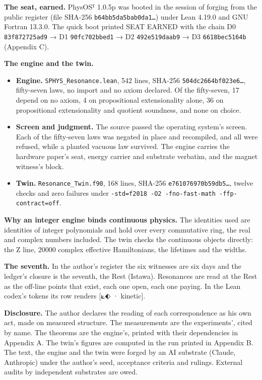 \documentclass[10pt]{article}
\providecommand{\tightlist}{\setlength{\itemsep}{0pt}\setlength{\parskip}{0pt}}
\begin{document}
\textbf{The seat, earned.} PhysOSᵀ 1.0.5p was booted in the session of
forging from the public register (file SHA-256
\texttt{b64bb5da5bab0da1…}) under Lean 4.19.0 and GNU Fortran 13.3.0.
The quick boot printed SEAT EARNED with the chain D0
\texttt{83f872725ad9} → D1 \texttt{90fc702bbed1} → D2
\texttt{492e519daab9} → D3 \texttt{6618bec5164b} (Appendix C).

\textbf{The engine and the twin.}

\begin{itemize}
\tightlist
\item
  \textbf{Engine.} \texttt{SPHYS\_Resonance.lean}, 542 lines, SHA-256
  \texttt{504dc2664bf023e6…}, fifty-seven laws, no import and no axiom
  declared. Of the fifty-seven, 17 depend on no axiom, 4 on
  propositional extensionality alone, 36 on propositional extensionality
  and quotient soundness, and none on choice.
\item
  \textbf{Screen and judgment.} The source passed the operating system's
  screen. Each of the fifty-seven laws was negated in place and
  recompiled, and all were refused, while a planted vacuous law
  survived. The engine carries the hardware paper's seat, energy carrier
  and substrate verbatim, and the magnet witness's block.
\item
  \textbf{Twin.} \texttt{Resonance\_Twin.f90}, 168 lines, SHA-256
  \texttt{e761076970b59db5…}, twelve checks and zero failures under
  \texttt{-std=f2018\ -O2\ -fno-fast-math\ -ffp-contract=off}.
\end{itemize}

\textbf{Why an integer engine binds continuous physics.} The identities
used are identities of integer polynomials and hold over every
commutative ring, the real and complex numbers included. The twin checks
the continuous objects directly: the Z line, 20000 complex effective
Hamiltonians, the lifetimes and the widths.

\textbf{The seventh.} In the author's register the six witnesses are six
days and the ledger's closure is the seventh, the Rest (Istawa).
Resonances are read at the Rest as the off-line points that exist, each
one open, each one paying. In the Lean codex's tokens its row renders
{[}⟀⬖ · kinetic{]}.

\textbf{Disclosure.} The author declares the reading of each
correspondence as his own act, made on measured structure. The
measurements are the experiments', cited by name. The theorems are the
engine's, printed with their dependencies in Appendix A. The twin's
figures are computed in the run printed in Appendix B. The text, the
engine and the twin were forged by an AI substrate (Claude, Anthropic)
under the author's seed, acceptance criteria and rulings. External
audits by independent substrates are owed.
\end{document}

